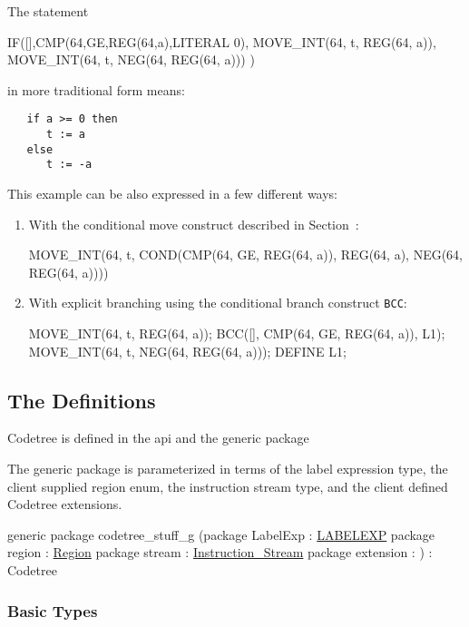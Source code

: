 The statement
\begin{SML}
   IF([],CMP(64,GE,REG(64,a),LITERAL 0),
         MOVE_INT(64, t, REG(64, a)),
         MOVE_INT(64, t, NEG(64, REG(64, a)))
     )
\end{SML}
in more traditional form means:
\begin{verbatim}
   if a >= 0 then 
      t := a
   else
      t := -a
\end{verbatim} 
This example can be also expressed in a few different ways: 
\begin{enumerate}
   \item With the conditional move construct described in 
Section~:
     \begin{SML}
    MOVE_INT(64, t, 
       COND(CMP(64, GE, REG(64, a)), 
            REG(64, a), 
            NEG(64, REG(64, a))))
     \end{SML}
  \item With explicit branching using the conditional branch
construct \verb|BCC|:
    \begin{SML}
     MOVE_INT(64, t, REG(64, a));
     BCC([], CMP(64, GE, REG(64, a)), L1);
     MOVE_INT(64, t, NEG(64, REG(64, a)));
     DEFINE L1;
    \end{SML}
\end{enumerate}
\subsection{The Definitions}

Codetree is defined in the api 
and the generic package 

The generic package  is parameterized in terms of
the label expression type, the client supplied region enum,
the instruction stream type, and the client defined Codetree extensions.
\begin{SML}
  generic package codetree_stuff_g
    (package LabelExp : \href{labelexp.html}{LABELEXP}
     package region : \href{regions.html}{Region}
     package stream : \href{streams.html}{Instruction_Stream}
     package extension : 
    ) : Codetree
\end{SML}

\subsubsection{Basic Types}

